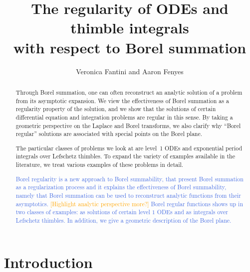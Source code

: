 \documentclass{article}
\title{The regularity of ODEs and thimble integrals \\
with respect to Borel summation}
\author{Veronica Fantini and Aaron Fenyes}
\theoremstyle{definition}
\theoremstyle{plain}
\begin{document}
\maketitle

\begin{abstract}
Through Borel summation, one can often reconstruct an analytic solution of a problem from its asymptotic expansion.
We view the effectiveness of Borel summation as a regularity property of the solution, and we show that the solutions of certain differential equation and integration problems are regular in this sense. By taking a geometric perspective on the Laplace and Borel transforms, we also clarify why ``Borel regular'' solutions are associated with special points on the Borel plane.

The particular classes of problems we look at are level~1 ODEs and exponential period integrals over Lefschetz thimbles. To expand the variety of examples available in the literature, we treat various examples of these problems in detail.

\textcolor{RoyalBlue}{
Borel regularity is a new approach to Borel summability, that present Borel summation as a regularization process and it explains the effectiveness of Borel summability, namely that Borel summation can be used to reconstruct analytic functions from their asymptotics. \textcolor{orange}{[Highlight analytic perspective more?]} Borel regular functions shows up in two classes of examples: as solutions of certain level $1$ ODEs and as integrals over Lefschetz thimbles. In addition, we give a geometric description of the Borel plane.}
\end{abstract}
\tableofcontents
%
%
%
\section{Introduction}
\end{document}
